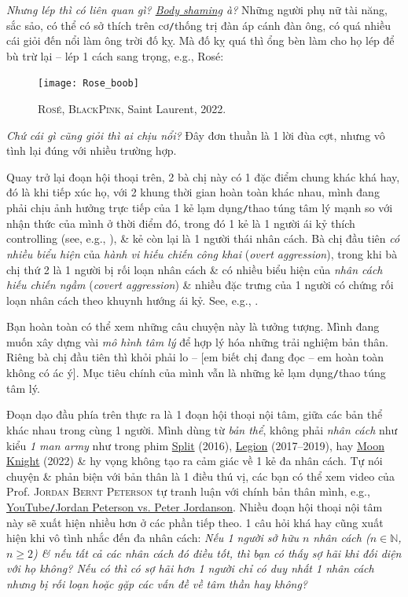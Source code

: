 \documentclass[12pt,twoside]{book}
\begin{document}
{\it Nhưng lép thì có liên quan gì? \href{https://en.wikipedia.org/wiki/Body_shaming}{Body shaming} à?} Những người phụ nữ tài năng, sắc sảo, có thể có sở thích trên cơ{\tt/}thống trị đàn áp cánh đàn ông, có quá nhiều cái giỏi đến nổi làm ông trời đố kỵ. Mà đố kỵ quá thì ổng bèn làm cho họ lép để bù trừ lại -- lép 1 cách sang trọng, e.g., Rosé:
\begin{figure}[H]
	\centering
	\texttt{[image: Rose\_boob]}
	\caption{\textsc{Rosé, BlackPink}, Saint Laurent, 2022.}
\end{figure}
{\it Chứ cái gì cũng giỏi thì ai chịu nổi?} Đây đơn thuần là 1 lời đùa cợt, nhưng vô tình lại đúng với nhiều trường hợp.

Quay trở lại đoạn hội thoại trên, 2 bà chị này có 1 đặc điểm chung khác khá hay, đó là khi tiếp xúc họ, với 2 khung thời gian hoàn toàn khác nhau, mình đang phải chịu ảnh hưởng trực tiếp của 1 kẻ lạm dụng{\tt/}thao túng tâm lý mạnh so với nhận thức của mình ở thời điểm đó, trong đó 1 kẻ là 1 người ái kỷ thích controlling (see, e.g., \cite{Bancroft2002}), \& kẻ còn lại là 1 người thái nhân cách. Bà chị đầu tiên {\it có nhiều biểu hiện} của {\it hành vi hiếu chiến công khai} ({\it overt aggression}), trong khi bà chị thứ 2 là 1 người bị rối loạn nhân cách \& có nhiều biểu hiện của {\it nhân cách hiếu chiến ngầm} ({\it covert aggression}) \& nhiều đặc trưng của 1 người có chứng rối loạn nhân cách theo khuynh hướng ái kỷ. See, e.g., \cite{Simon2010}.

Bạn hoàn toàn có thể xem những câu chuyện này là tưởng tượng. Mình đang muốn xây dựng vài {\it mô hình tâm lý} để hợp lý hóa những trải nghiệm bản thân. Riêng bà chị đầu tiên thì khỏi phải lo -- [em biết chị đang đọc -- em hoàn toàn không có ác ý]. Mục tiêu chính của mình vẫn là những kẻ lạm dụng{\tt/}thao túng tâm lý.

Đoạn dạo đầu phía trên thực ra là 1 đoạn hội thoại nội tâm, giữa các bản thể khác nhau trong cùng 1 người. Mình dùng từ {\it bản thể}, không phải {\it nhân cách} như kiểu {\it 1 man army} như trong phim \href{https://www.imdb.com/title/tt4972582/}{Split} (2016), \href{https://www.imdb.com/title/tt5114356/}{Legion} (2017--2019), hay \href{https://www.imdb.com/title/tt10234724}{Moon Knight} (2022) \& hy vọng không tạo ra cảm giác về 1 kẻ đa nhân cách. Tự nói chuyện \& phản biện với bản thân là 1 điều thú vị, các bạn có thể xem video của Prof. \textsc{Jordan Bernt Peterson} tự tranh luận với chính bản thân mình, e.g., \href{https://www.youtube.com/watch?v=buD2RM0xChM}{YouTube{\tt/}Jordan Peterson vs. Peter Jordanson}. Nhiều đoạn hội thoại nội tâm này sẽ xuất hiện nhiều hơn ở các phần tiếp theo. 1 câu hỏi khá hay cũng xuất hiện khi vô tình nhắc đến đa nhân cách: {\it Nếu 1 người sở hữu $n$ nhân cách ($n\in\mathbb{N}$, $n\ge 2$) \& nếu tất cả các nhân cách đó điều tốt, thì bạn có thấy sợ hãi khi đối diện với họ không? Nếu có thì có sợ hãi hơn 1 người chỉ có duy nhất 1 nhân cách nhưng bị rối loạn hoặc gặp các vấn đề về tâm thần hay không?}
\end{document}
